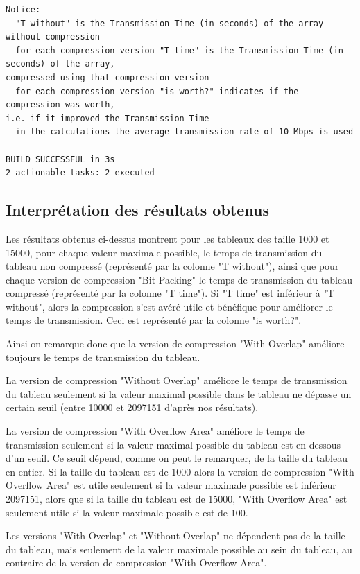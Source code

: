 \documentclass[titlepage]{article}
\begin{document}
{\begin{lstlisting}
Notice:
- "T_without" is the Transmission Time (in seconds) of the array without compression
- for each compression version "T_time" is the Transmission Time (in seconds) of the array,
compressed using that compression version
- for each compression version "is worth?" indicates if the compression was worth,
i.e. if it improved the Transmission Time
- in the calculations the average transmission rate of 10 Mbps is used

BUILD SUCCESSFUL in 3s
2 actionable tasks: 2 executed
\end{lstlisting}
}

\subsection{Interprétation des résultats obtenus}

Les résultats obtenus ci-dessus montrent pour les tableaux des taille 1000 et 15000, pour chaque valeur maximale possible, le temps de transmission du tableau non compressé (représenté par la colonne "T without"), ainsi que pour chaque version de compression "Bit Packing" le temps de transmission du tableau compressé (représenté par la colonne "T time"). Si "T time" est inférieur à "T without", alors la compression s'est avéré utile et bénéfique pour améliorer le temps de transmission. Ceci est représenté par la colonne "is worth?".
\par Ainsi on remarque donc que la version de compression "With Overlap" améliore toujours le temps de transmission du tableau.
\par La version de compression "Without Overlap" améliore le temps de transmission du tableau seulement si la valeur maximal possible dans le tableau ne dépasse un certain seuil (entre 10000 et 2097151 d'après nos résultats).
\par La version de compression "With Overflow Area" améliore le temps de transmission seulement si la valeur maximal possible du tableau est en dessous d'un seuil. Ce seuil dépend, comme on peut le remarquer, de la taille du tableau en entier. Si la taille du tableau est de 1000 alors la version de compression "With Overflow Area" est utile seulement si la valeur maximale possible est inférieur 2097151, alors que si la taille du tableau est de 15000, "With Overflow Area" est seulement utile si la valeur maximale possible est de 100.
\par Les versions "With Overlap" et "Without Overlap" ne dépendent pas de la taille du tableau, mais seulement de la valeur maximale possible au sein du tableau, au contraire de la version de compression "With Overflow Area".
\end{document}
